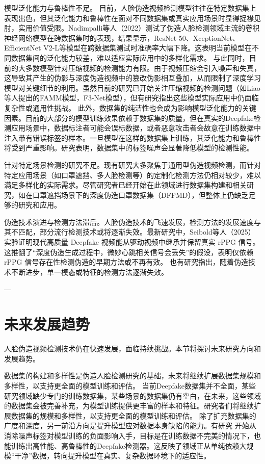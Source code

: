 \documentclass[conference]{IEEEtran}
\begin{document}
模型泛化能力与鲁棒性不足。
目前，人脸伪造视频检测模型往往在特定数据集上表现出色，但其泛化能力和鲁棒性在面对不同数据集或真实应用场景时显得捉襟见肘，实用价值受限。Nadimpalli等人（2022）测试了伪造人脸检测领域主流的卷积神经网络模型在跨数据集时的表现，结果显示，ResNet-50、XceptionNet、EfficientNet V2-L等模型在跨数据集测试时准确率大幅下降。这表明当前模型在不同数据集间的泛化能力较差，难以适应实际应用中的多样化需求\cite{A.A.-429}。
与此同时，目前的大多数模型针对压缩视频的检测能力有限。由于视频压缩会引入噪声和失真，这导致其产生的伪影与深度伪造视频中的篡改伪影相互叠加，从而限制了深度学习模型对关键细节的利用。虽然目前的研究已开始关注压缩视频的检测问题（如Liao等人提出的FAMM模型\cite{LiaoWang-137}，F3-Net模型\cite{M.Z.-432}），但有研究指出这些模型实际应用中仍面临复杂性或通用性挑战\cite{ChenLiao-250}。
此外，数据集的纯洁性也会成为影响模型泛化能力的关键因素。目前的大部分的模型训练效果依赖于数据集的质量，但在真实的Deepfake检测应用场景中，数据标注者可能会误标数据，或者恶意攻击者会故意在训练数据中注入带有错误标签的样本。一旦模型在这样的数据集上训练，其泛化能力和鲁棒性将受到严重影响。研究表明，数据集中的标签噪声会显著降低模型的检测性能\cite{QiaoXie-152}。

针对特定场景检测的研究不足。现有研究大多聚焦于通用型伪造视频检测，而针对特定应用场景（如口罩遮挡、多人脸检测等）的定制化检测方法仍相对较少，难以满足多样化的实际需求。尽管研究者已经开始在此领域进行数据集构建和相关研究，如在口罩遮挡场景下的深度伪造口罩数据集（DFFMD）\cite{AlnaimAlmutairi-36}，但整体上仍缺乏足够的研究和应用。

伪造技术演进与检测方法滞后。人脸伪造技术的飞速发展，检测方法的发展速度与其不匹配，部分流行检测技术或将逐渐失效。最新研究中，Seibold等人（2025）实验证明现代高质量 Deepfake 视频能从驱动视频中继承并保留真实 rPPG 信号。这推翻了“深度伪造生成过程中，微妙心跳相关信号会丢失”的假设，表明仅依赖 rPPG 信号存在性检测伪造的早期方法或不再有效\cite{Seibold2025HighQuality}。
也有研究指出，随着伪造技术不断进步，单一模态或特征的检测方法逐渐失效\cite{Amirabadi2024DeepFakeReview}。

---

\section{未来发展趋势}
人脸伪造视频检测技术仍在快速发展，面临持续挑战。本节将探讨未来研究方向和发展趋势。

数据集的构建和多样性是伪造人脸检测研究的基础，未来将继续扩展数据集规模和多样性，以支持更全面的模型训练和评估。
当前Deepfake数据集并不全面，某些研究领域缺少专门的训练数据集，某些场景的数据集仍有空白，在未来，这些领域的数据集会被完善补充，为模型训练提供更丰富的样本和特征。研究者们将继续扩展数据集的规模和多样性，以支持更全面的模型训练和评估。
除了扩充数据集的广度和深度，另一前沿方向是提升模型应对数据本身缺陷的能力。有研究 \cite{QiaoXie-152} 开始从消除噪声标签对模型训练的负面影响入手，目标是在训练数据不完美的情况下，也能训练出高性能、高鲁棒性的Deepfake检测器。这反映了领域正从单纯依赖大规模“干净”数据，转向提升模型在真实、复杂数据环境下的适应性。
\end{document}
